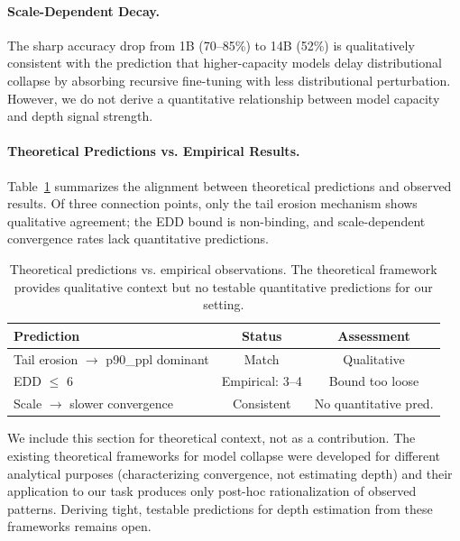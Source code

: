 \documentclass[11pt,a4paper]{article}
\begin{document}
\paragraph{Scale-Dependent Decay.}
The sharp accuracy drop from 1B (70--85\%) to 14B (52\%) is qualitatively consistent with the prediction that higher-capacity models delay distributional collapse by absorbing recursive fine-tuning with less distributional perturbation. However, we do not derive a quantitative relationship between model capacity and depth signal strength.

\paragraph{Theoretical Predictions vs. Empirical Results.}
Table~\ref{tab:theory} summarizes the alignment between theoretical predictions and observed results. Of three connection points, only the tail erosion mechanism shows qualitative agreement; the EDD bound is non-binding, and scale-dependent convergence rates lack quantitative predictions.

\begin{table}[t]
\centering
\caption{Theoretical predictions vs. empirical observations. The theoretical framework provides qualitative context but no testable quantitative predictions for our setting.}
\label{tab:theory}
\small
\begin{tabular}{lcc}
\toprule
\textbf{Prediction} & \textbf{Status} & \textbf{Assessment} \\
\midrule
Tail erosion $\to$ p90\_ppl dominant & Match & Qualitative \\
EDD $\leq$ 6 & Empirical: 3--4 & Bound too loose \\
Scale $\to$ slower convergence & Consistent & No quantitative pred. \\
\bottomrule
\end{tabular}
\end{table}

We include this section for theoretical context, not as a contribution. The existing theoretical frameworks for model collapse were developed for different analytical purposes (characterizing convergence, not estimating depth) and their application to our task produces only post-hoc rationalization of observed patterns. Deriving tight, testable predictions for depth estimation from these frameworks remains open.

\end{document}

